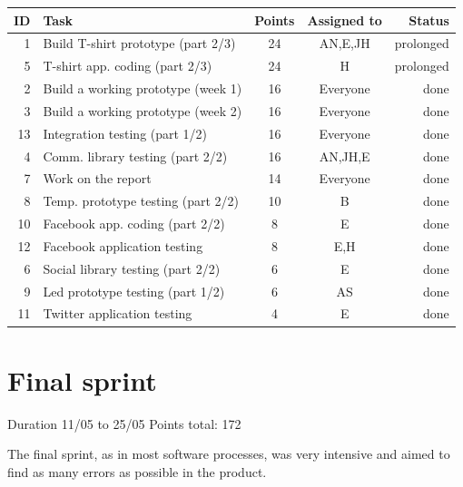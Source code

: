\begin{table}[ht!]
\begin{tabular}{ | r | l | c | c | r | }

\hline
\textbf{ID} & \textbf{Task} & \textbf{Points} & \textbf{Assigned to} & \textbf{Status} \\
\hline

 1 & Build T-shirt prototype (part 2/3)			& 24 & AN,E,JH		& prolonged \\
\hline
 5 & T-shirt app. coding (part 2/3)				& 24 & H			& prolonged \\
\hline
 2 & Build a working prototype (week 1)			& 16 & Everyone		& done \\
\hline
 3 & Build a working prototype (week 2)			& 16 & Everyone		& done \\
\hline
 13 & Integration testing (part 1/2)			& 16 & Everyone		& done \\
\hline
 4 & Comm. library testing (part 2/2)			& 16 & AN,JH,E		& done \\
\hline
 7 & Work on the report							& 14 & Everyone		& done \\
\hline
 8 & Temp. prototype testing (part 2/2)			& 10 & B			& done \\
\hline
 10 & Facebook app. coding (part 2/2)			& 8  & E			& done \\
\hline
 12 & Facebook application testing				& 8  & E,H			& done \\
\hline
 6 & Social library testing (part 2/2)			& 6  & E			& done \\
\hline
 9 & Led prototype testing (part 1/2)			& 6  & AS			& done \\
\hline
 11 & Twitter application testing				& 4	 & E			& done \\
\hline

\end{tabular}
\end{table}

\newpage

\section{Final sprint}

Duration 11/05 to 25/05\newline
Points total: 172

The final sprint, as in most software processes, was very intensive and aimed
to find as many errors as possible in the product.

